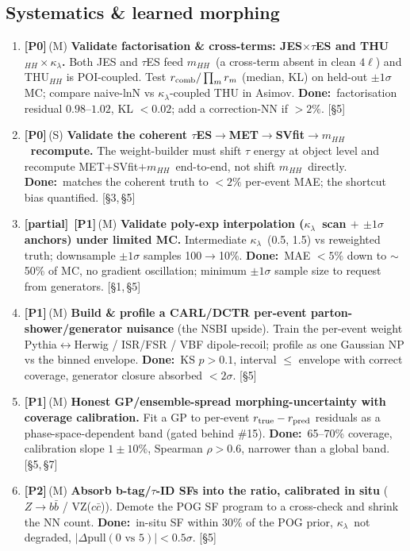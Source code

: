 \documentclass[11pt]{article}
\newcommand{\kl}{\ensuremath{\kappa_\lambda}}
\newcommand{\mhh}{\ensuremath{m_{HH}}}
\newcommand{\priZ}{\textcolor{red!75!black}{\textbf{[P0]}}}
\newcommand{\priO}{\textcolor{orange!85!black}{\textbf{[P1]}}}
\newcommand{\priT}{\textcolor{gray!65!black}{\textbf{[P2]}}}
\newcommand{\eff}[1]{{\footnotesize\textcolor{gray!65!black}{(#1)}}}
\newcommand{\sref}[1]{ {\footnotesize\textcolor{gray!60!black}{[#1]}}}
\newcommand{\dw}{\textcolor{green!30!black}{\textbf{Done:}}~}
\newcommand{\stPart}{\textcolor{orange!90!black}{\textbf{[partial]}}}
\begin{document}
\subsection*{Systematics \& learned morphing}
\begin{enumerate}[resume,leftmargin=2.6em]\small
\item \priZ\,\eff{M} \textbf{Validate factorisation \& cross-terms: JES$\times\tau$ES and THU$_{HH}\times$\kl.} Both
JES and $\tau$ES feed \mhh\ (a cross-term absent in clean $4\ell$) and THU$_{HH}$ is POI-coupled. Test
$r_{\rm comb}/\prod_m r_m$ (median, KL) on held-out $\pm1\sigma$ MC; compare naive-lnN vs \kl-coupled THU in
Asimov. \dw factorisation residual $0.98$--$1.02$, KL $<0.02$; add a correction-NN if $>2\%$. \sref{\S5}
\item \priZ\,\eff{S} \textbf{Validate the coherent $\tau$ES$\to$MET$\to$SVfit$\to$\mhh\ recompute.} The
weight-builder must shift $\tau$ energy at object level and recompute MET$+$SVfit$+$\mhh\ end-to-end, not shift
\mhh\ directly. \dw matches the coherent truth to $<2\%$ per-event MAE; the shortcut bias quantified. \sref{\S3,\,\S5}
\item \stPart\ \priO\,\eff{M} \textbf{Validate poly-exp interpolation (\kl\ scan $+$ $\pm1\sigma$ anchors) under limited MC.}
Intermediate \kl\ (0.5, 1.5) vs reweighted truth; downsample $\pm1\sigma$ samples 100$\to$10\%. \dw MAE $<5\%$ down
to $\sim$50\% of MC, no gradient oscillation; minimum $\pm1\sigma$ sample size to request from generators. \sref{\S1,\,\S5}
\item \priO\,\eff{M} \textbf{Build \& profile a CARL/DCTR per-event parton-shower/generator nuisance} (the NSBI
upside). Train the per-event weight Pythia$\leftrightarrow$Herwig / ISR/FSR / VBF dipole-recoil; profile as one
Gaussian NP vs the binned envelope. \dw KS $p>0.1$, interval $\le$ envelope with correct coverage, generator
closure absorbed $<2\sigma$. \sref{\S5}
\item \priO\,\eff{M} \textbf{Honest GP/ensemble-spread morphing-uncertainty with coverage calibration.} Fit a GP to
per-event $r_{\rm true}-r_{\rm pred}$ residuals as a phase-space-dependent band (gated behind \#15). \dw 65--70\%
coverage, calibration slope $1\pm10\%$, Spearman $\rho>0.6$, narrower than a global band. \sref{\S5,\,\S7}
\item \priT\,\eff{M} \textbf{Absorb b-tag/$\tau$-ID SFs into the ratio, calibrated in situ} ($Z\to b\bar b$ /
VZ($c\bar c$)). Demote the POG SF program to a cross-check and shrink the NN count. \dw in-situ SF within 30\% of
the POG prior, \kl\ not degraded, $|\Delta\text{pull}(0\text{ vs }5)|<0.5\sigma$. \sref{\S5}
\end{enumerate}
\end{document}
